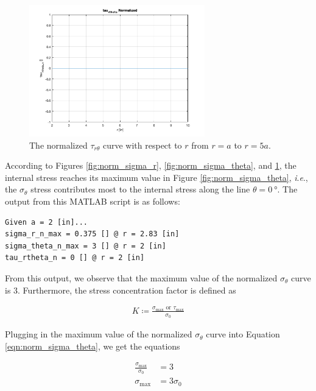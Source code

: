 \documentclass[12 pt]{article}
\newcommand{\ie}{\textit{i}.\textit{e}., }
\begin{document}
\begin{figure}[htbp]
\centering
\includegraphics[width=3in]{images/Graphs/tau_rtheta_normalized}
\caption{The normalized $\tau_{r\theta}$ curve with respect to $r$ from $r=a$ to $r=5a$.}
\label{fig:norm_tau_rtheta}
\end{figure}

According to Figures \ref{fig:norm_sigma_r}, \ref{fig:norm_sigma_theta}, and \ref{fig:norm_tau_rtheta}, the internal stress reaches its maximum value in Figure \ref{fig:norm_sigma_theta}, \ie the $\sigma_\theta$ stress contributes most to the internal stress along the line $\theta=\qty{0}{\degree}$. The output from this MATLAB script is as follows:

\begin{tcolorbox}
\begin{verbatim}
Given a = 2 [in]...
sigma_r_n_max = 0.375 [] @ r = 2.83 [in]
sigma_theta_n_max = 3 [] @ r = 2 [in]
tau_rtheta_n = 0 [] @ r = 2 [in]
\end{verbatim}
\end{tcolorbox}

From this output, we observe that the maximum value of the normalized $\sigma_\theta$ curve is \num{3}. Furthermore, the stress concentration factor is defined as

\begin{align}
K\coloneqq\frac{\sigma_\text{max}\text{ or }\tau_\text{max}}{\sigma_0} \label{eqn:def_K}
\end{align}

Plugging in the maximum value of the normalized $\sigma_\theta$ curve into Equation \ref{eqn:norm_sigma_theta}, we get the equations

\begin{align}
\frac{\sigma_\text{max}}{\sigma_0}&=3 \\
\sigma_\text{max}&=3\sigma_0 \label{eqn:sigma_max}
\end{align}
\end{document}
